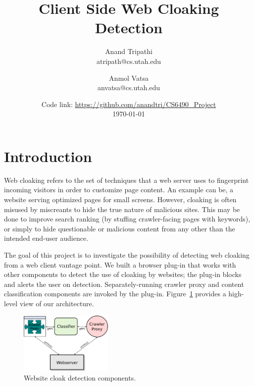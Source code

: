 \documentclass[letterpaper,twocolumn,10pt]{article}
\title{\vspace{-2.0cm}Client Side Web Cloaking Detection}
\author{
Anand Tripathi\\
       atripath@cs.utah.edu
\and
Anmol Vatsa\\
       anvatsa@cs.utah.edu
}
\date{Code link: \url{https://github.com/anandtri/CS6490\_Project}\\
\today}
\begin{document}
\maketitle

\section{Introduction}
Web cloaking refers to the set of techniques that a web server uses to fingerprint incoming visitors in order to customize page content. An example can be, a website serving optimized pages for small screens. However, cloaking is often misused by miscreants to hide the true nature of malicious sites.  This may be done to improve search ranking (by stuffing crawler-facing pages with keywords), or simply to hide questionable or malicious content from any other than the intended end-user audience.


The goal of this project is to investigate the possibility of detecting web cloaking from a web client vantage point.  We built a browser plug-in that works with other components to detect the use of cloaking by websites; the plug-in blocks and alerts the user on detection. Separately-running crawler proxy and content classification components are invoked by the plug-in.  Figure~\ref{fig:arch} provides a high-level view of our architecture.

\begin{figure}[ht]
  \centering
  \includegraphics[width=0.4\textwidth]{./proj-diagram.png}
  \caption{Website cloak detection components.}
  \label{fig:arch}
\end{figure}
\end{document}
